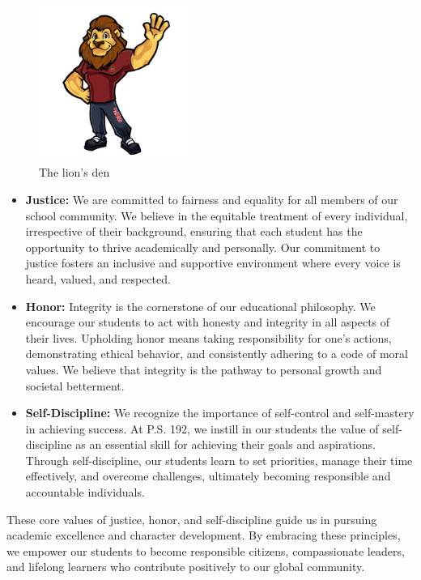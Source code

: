 \documentclass[11pt]{article}
\begin{document}
\begin{figure}
    \includegraphics[width=0.45\textwidth]{static/logohim.png}
    \caption{The lion's den}
    \label{fig:yourlabel}
\end{figure}
\begin{itemize}
\item \textbf{\textbf{Justice:}} We are committed to fairness and equality for all members of our school community. We believe in the equitable treatment of every individual, irrespective of their background, ensuring that each student has the opportunity to thrive academically and personally. Our commitment to justice fosters an inclusive and supportive environment where every voice is heard, valued, and respected.

\item \textbf{\textbf{Honor:}} Integrity is the cornerstone of our educational philosophy. We encourage our students to act with honesty and integrity in all aspects of their lives. Upholding honor means taking responsibility for one’s actions, demonstrating ethical behavior, and consistently adhering to a code of moral values. We believe that integrity is the pathway to personal growth and societal betterment.

\item \textbf{\textbf{Self-Discipline:}} We recognize the importance of self-control and self-mastery in achieving success. At P.S. 192, we instill in our students the value of self-discipline as an essential skill for achieving their goals and aspirations. Through self-discipline, our students learn to set priorities, manage their time effectively, and overcome challenges, ultimately becoming responsible and accountable individuals.
\end{itemize}

These core values of justice, honor, and self-discipline guide us in pursuing academic excellence and character development. By embracing these principles, we empower our students to become responsible citizens, compassionate leaders, and lifelong learners who contribute positively to our global community.
\end{document}
